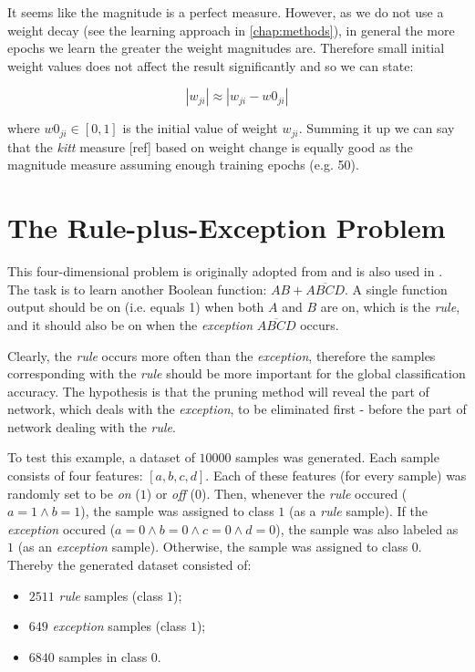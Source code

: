 It seems like the magnitude is a perfect measure. However, as we do not use a weight decay (see the learning approach in \cref{chap:methods}), in general the more epochs we learn the greater the weight magnitudes are. Therefore small initial weight values does not affect the result significantly and so we can state:

\begin{equation}
|w_{ji}| \approx |w_{ji} - w0_{ji}|
\end{equation}

where $ w0_{ji} \in [0, 1] $ is the initial value of weight $ w_{ji} $. Summing it up we can say that the \textit{kitt} measure [ref] based on weight change is equally good as the magnitude measure assuming enough training epochs (e.g. 50).

\section{The Rule-plus-Exception Problem} \label{sec:dataset_rpe}
This four-dimensional problem is originally adopted from \citep{mozer_smolensky} and is also used in \citep{karnin}. The task is to learn another Boolean function: $ AB+\overline{ABCD} $. A single function output should be on (i.e. equals 1) when both $ A $ and $ B $ are on, which is the \textit{rule}, and it should also be on when the \textit{exception} $ \overline{ABCD} $ occurs.

Clearly, the \textit{rule} occurs more often than the \textit{exception}, therefore the samples corresponding with the \textit{rule} should be more important for the global classification accuracy. The hypothesis is that the pruning method will reveal the part of network, which deals with the \textit{exception}, to be eliminated first - before the part of network dealing with the \textit{rule}.

To test this example, a dataset of $ 10000 $ samples was generated. Each sample consists of four features: $ [a, b, c, d] $. Each of these features (for every sample) was randomly set to be \textit{on} ($ 1 $) or \textit{off} ($ 0 $). Then, whenever the \textit{rule} occured ($ a = 1 \wedge b = 1 $), the sample was assigned to class $ 1 $ (as a \textit{rule} sample). If the \textit{exception} occured ($ a = 0 \wedge b = 0 \wedge c = 0 \wedge d = 0 $), the sample was also labeled as $ 1 $ (as an \textit{exception} sample). Otherwise, the sample was assigned to class $ 0 $. Thereby the generated dataset consisted of:

\begin{itemize}
\item $ 2511 $ \textit{rule} samples (class $ 1 $);
\item $ 649 $ \textit{exception} samples (class $ 1 $);
\item $ 6840 $ samples in class $ 0 $.
\end{itemize}

